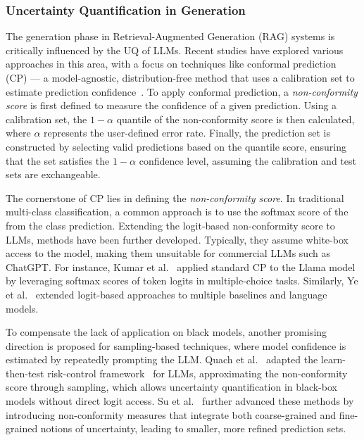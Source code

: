 

\subsubsection{Uncertainty Quantification in Generation}
The generation phase in Retrieval-Augmented Generation (RAG) systems is critically influenced by the UQ of LLMs. Recent studies have explored various approaches in this area, with a focus on techniques like conformal prediction (CP) — a model-agnostic, distribution-free method that uses a calibration set to estimate prediction confidence~\cite{shafer2007tutorialconformalprediction}. To apply conformal prediction, a \textit{non-conformity score} is first defined to measure the confidence of a given prediction. Using a calibration set, the $1-\alpha$ quantile of the non-conformity score is then calculated, where $\alpha$ represents the user-defined error rate. Finally, the prediction set is constructed by selecting valid predictions based on the quantile score, ensuring that the set satisfies the $1-\alpha$ confidence level, assuming the calibration and test sets are exchangeable.

The cornerstone of CP lies in defining the \textit{non-conformity score}. In traditional multi-class classification, a common approach is to use the softmax score of the from the class prediction. Extending the logit-based non-conformity score to LLMs, methods have been further developed. Typically, they assume white-box access to the model, making them unsuitable for commercial LLMs such as ChatGPT. For instance, Kumar et al.~\cite{kumar2023conformalpredictionlargelanguage} applied standard CP to the Llama model~\cite{touvron2023llamaopenefficientfoundation} by leveraging softmax scores of token logits in multiple-choice tasks. Similarly, Ye et al.~\cite{ye2024benchmarkingllmsuncertaintyquantification} extended logit-based approaches to multiple baselines and language models.

To compensate the lack of application on black models, another promising direction is proposed for sampling-based techniques, where model confidence is estimated by repeatedly prompting the LLM. Quach et al.~\cite{quach2024conformallanguagemodeling} adapted the learn-then-test risk-control framework~\cite{angelopoulos2022learntestcalibratingpredictive} for LLMs, approximating the non-conformity score through sampling, which allows uncertainty quantification in black-box models without direct logit access. Su et al.~\cite{su2024apienoughconformalprediction} further advanced these methods by introducing non-conformity measures that integrate both coarse-grained and fine-grained notions of uncertainty, leading to smaller, more refined prediction sets.

